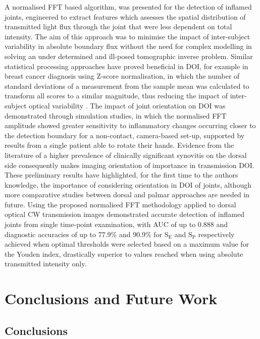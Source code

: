 \documentclass[twoside]{bhamthesis}
\theoremstyle{definition}
\begin{document}
A normalised FFT based algorithm, was presented for the detection of inflamed joints, engineered to extract features which assesses the spatial distribution of transmitted light flux through the joint that were less dependent on total intensity. The aim of this approach was to minimise the impact of inter-subject variability in absolute boundary flux without the need for complex modelling in solving an under determined and ill-posed tomographic inverse problem. Similar statistical processing approaches have proved beneficial in DOI, for example in breast cancer diagnosis using Z-score normalisation, in which the number of standard deviations of a measurement from the sample mean was calculated to transform all scores to a similar magnitude, thus reducing the impact of inter-subject optical variability \cite{cochran2018tissue}. The impact of joint orientation on DOI was demonstrated through simulation studies, in which the normalised FFT amplitude showed greater sensitivity to inflammatory changes occurring closer to the detection boundary for a non-contact, camera-based set-up, supported by results from a single patient able to rotate their hands. Evidence from the literature of a higher prevalence of clinically significant synovitis on the dorsal side consequently makes imaging orientation of importance in transmission DOI. These preliminary results have highlighted, for the first time to the authors knowledge, the importance of considering orientation in DOI of joints, although more comparative studies between dorsal and palmar approaches are needed in future. Using the proposed normalised FFT methodology applied to dorsal optical CW transmission images demonstrated accurate detection of inflamed joints from single time-point examination, with AUC of up to 0.888 and diagnostic accuracies of up to 77.9\% and 90.9\% for $\mathrm{S_E}$ and $\mathrm{S_P}$ respectively achieved when optimal thresholds were selected based on a maximum value for the Youden index, drastically superior to values reached when using absolute transmitted intensity only.

\chapter{Conclusions and Future Work}
\label{Conclusions and Future Work}

\section{Conclusions}
\end{document}
